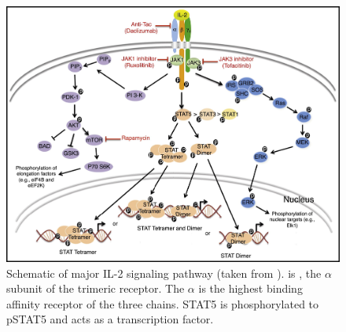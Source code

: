 \begin{figure}[h]
\centering
\includegraphics[scale=0.75]{IL2/figures/IL2-pathway.jpg}
{Schematic of major IL-2 signaling pathway (taken from \citet{Liao:2013jt}).}
{
 is , the $\alpha$ subunit of the trimeric  receptor.
The $\alpha$ is the highest binding affinity receptor of the three chains.
STAT5 is phosphorylated to pSTAT5 and acts as a transcription factor.
}
\end{figure}

